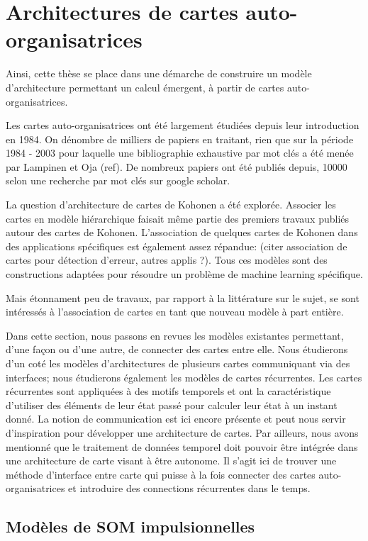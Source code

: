\section{Architectures de cartes auto-organisatrices}

Ainsi, cette thèse se place dans une démarche de construire un modèle d'architecture permettant un calcul émergent, à partir de cartes auto-organisatrices.

Les cartes auto-organisatrices ont été largement étudiées depuis leur introduction en 1984. On dénombre de milliers de papiers en traitant, rien que sur la période 1984 - 2003 pour laquelle une bibliographie exhaustive par mot clés a été menée par Lampinen et Oja (ref). De nombreux papiers ont été publiés depuis, 10000 selon une recherche par mot clés sur google scholar. 

La question d'architecture de cartes de Kohonen a été explorée. Associer les cartes en modèle hiérarchique faisait même partie des premiers travaux publiés autour des cartes de Kohonen.
L'association de quelques cartes de Kohonen dans des applications spécifiques est également assez répandue:
(citer association de cartes pour détection d'erreur, autres applis ?). Tous ces modèles sont des constructions adaptées pour résoudre un problème de machine learning spécifique.

Mais étonnament peu de travaux, par rapport à la littérature sur le sujet, se sont intéressés à l'association de cartes en tant que nouveau modèle à part entière.

Dans cette section, nous passons en revues les modèles existantes permettant, d'une façon ou d'une autre, de connecter des cartes entre elle. Nous étudierons d'un coté les modèles d'architectures de plusieurs cartes communiquant via des interfaces; nous étudierons également les modèles de cartes récurrentes. Les cartes récurrentes sont appliquées à des motifs temporels et ont la caractéristique d'utiliser des éléments de leur état passé pour calculer leur état à un instant donné. La notion de communication est ici encore présente et peut nous servir d'inspiration pour développer une architecture de cartes. Par ailleurs, nous avons mentionné que le traitement de données temporel doit pouvoir être intégrée dans une architecture de carte visant à être autonome. Il s'agit ici de trouver une méthode d'interface entre carte qui puisse à la fois connecter des cartes auto-organisatrices et introduire des connections récurrentes dans le temps. 

\subsection{Modèles de SOM impulsionnelles}

